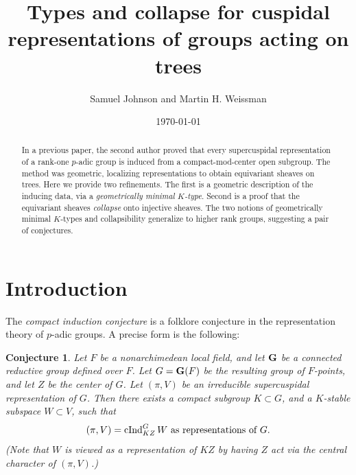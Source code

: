 \documentclass[letter]{amsart}
\newtheorem{conj}[thm]{Conjecture}
\theoremstyle{definition}
\theoremstyle{remark}
\numberwithin{thm}{section}
\numberwithin{equation}{section}
\begin{document}
\title{Types and collapse for cuspidal representations of groups acting on trees}%
\author{Samuel Johnson and Martin H. Weissman}%
\date{\today}

\address{Dept. of Mathematics, University of California, Santa Cruz, CA 95064}
%

\begin{abstract}
In a previous paper, the second author proved that every supercuspidal representation of a rank-one $p$-adic group is induced from a compact-mod-center open subgroup.  The method was geometric, localizing representations to obtain equivariant sheaves on trees.  Here we provide two refinements.  The first is a geometric description of the inducing data, via a {\em geometrically minimal $K$-type}.  Second is a proof that the equivariant sheaves {\em collapse} onto injective sheaves.  The two notions of geometrically minimal $K$-types and collapsibility generalize to higher rank groups, suggesting a pair of conjectures.
\end{abstract}

\maketitle

\tableofcontents

\section{Introduction}

The {\em compact induction conjecture} is a folklore conjecture in the representation theory of $p$-adic groups.  A precise form is the following:  
\begin{conj}
\label{cind}
Let $F$ be a nonarchimedean local field, and let $\boldsymbol{\mathrm{G}}$ be a connected reductive group defined over $F$.  Let $G = \boldsymbol{\mathrm{G}}(F)$ be the resulting group of $F$-points, and let $Z$ be the center of $G$.  Let $(\pi, V)$ be an irreducible supercuspidal representation of $G$.  Then there exists a compact subgroup $K \subset G$, and a $K$-stable subspace $W \subset V$, such that
$$(\pi, V) = \operatorname{cInd}_{KZ}^G W \text{ as representations of } G.$$ 
(Note that $W$ is viewed as a representation of $KZ$ by having $Z$ act via the central character of $(\pi, V)$.)
\end{conj}
\end{document}
